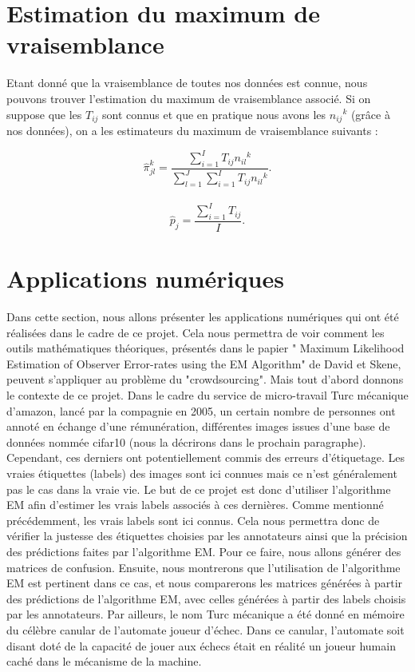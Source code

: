\documentclass[a4paper,french,10pt]{article}
\begin{document}
	\section{Estimation du maximum de vraisemblance}
	Etant donné que la vraisemblance de toutes nos données est connue, nous pouvons trouver l'estimation du maximum de vraisemblance associé. Si on suppose que les $T_{ij}$ sont connus et que en pratique nous avons les ${{n_{ij}}^{k}}$ (grâce à nos données), on a les estimateurs du maximum de vraisemblance suivants :
	
	\[\hat{\pi}_{jl}^k = \frac{\sum_{i=1}^{I} T_{ij} {n_{il}}^{k}}{\sum_{l=1}^{J} \sum_{i=1}^{I}  T_{ij} {n_{il}}^{k}}.\]\\
	\[\hat{p}_j = \frac{\sum_{i=1}^{I} T_{ij}}{I}.\]

	
	\section{Applications numériques}
	
	Dans cette section, nous allons présenter les applications numériques qui ont été réalisées dans le cadre de ce projet.
	Cela nous permettra de voir comment les outils mathématiques théoriques, présentés dans le papier " Maximum Likelihood Estimation of Observer
	Error-rates using the EM Algorithm" de David et Skene, peuvent s'appliquer au problème du "crowdsourcing". Mais tout d'abord donnons le contexte de ce projet.
	Dans le cadre du service de micro-travail Turc mécanique d'amazon, lancé par la compagnie en 2005, un certain nombre de personnes ont annoté en échange d'une rémunération, différentes images issues d'une base de données nommée cifar10 (nous la décrirons dans le prochain paragraphe). Cependant, ces derniers ont potentiellement commis des erreurs d'étiquetage. Les vraies étiquettes (labels) des images sont ici connues mais ce n'est généralement pas le cas dans la vraie vie. Le but de ce projet est donc d'utiliser l'algorithme EM afin d'estimer les vrais labels associés à ces dernières.
	Comme mentionné précédemment, les vrais labels sont ici connus. Cela nous permettra donc de vérifier la justesse des étiquettes choisies par les annotateurs ainsi que la précision des prédictions faites par l'algorithme EM. Pour ce faire, nous allons générer des matrices de confusion. Ensuite, nous montrerons que l'utilisation de l'algorithme EM est pertinent dans ce cas, et nous comparerons les matrices générées à partir des prédictions de l'algorithme EM, avec celles générées à partir des labels choisis par les annotateurs. Par ailleurs, le nom Turc mécanique a été donné en mémoire du célèbre canular de l'automate joueur d'échec. Dans ce canular, l'automate soit disant doté de la capacité de jouer aux échecs était en réalité un joueur humain caché dans le mécanisme de la machine.
	
\end{document}
